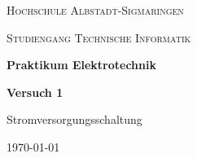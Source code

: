     \begin{titlepage}
        \centering
        {\scshape\LARGE Hochschule Albstadt-Sigmaringen \par}
        {\scshape\large Studiengang Technische Informatik \par}
        \vspace{3cm}
        {\LARGE\bfseries Praktikum Elektrotechnik\par}
        \vspace{2cm}
        {\Huge\bfseries Versuch 1\par}
        \vspace{1cm}
        {\Large Stromversorgungsschaltung\par}
        \vspace{2cm}
        \vfill

        {\large \today\par}
    \end{titlepage}